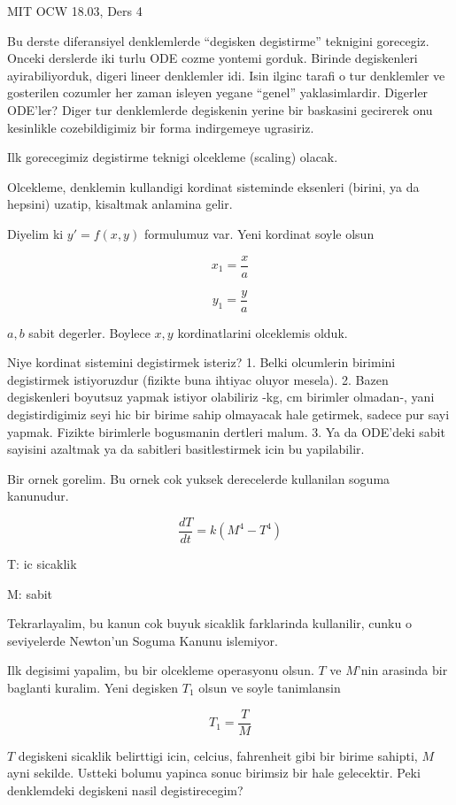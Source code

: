 \documentclass[12pt,fleqn]{article}
\begin{document}
MIT OCW 18.03, Ders 4

Bu derste diferansiyel denklemlerde ``degisken degistirme'' teknigini
gorecegiz. Onceki derslerde iki turlu ODE cozme yontemi
gorduk. Birinde degiskenleri ayirabiliyorduk, digeri lineer denklemler
idi. Isin ilginc tarafi o tur denklemler ve gosterilen cozumler her
zaman isleyen yegane ``genel'' yaklasimlardir. Digerler ODE'ler? Diger
tur denklemlerde degiskenin yerine bir baskasini gecirerek onu
kesinlikle cozebildigimiz bir forma indirgemeye ugrasiriz.

Ilk gorecegimiz degistirme teknigi olcekleme (scaling) olacak. 

Olcekleme, denklemin kullandigi kordinat sisteminde eksenleri (birini,
ya da hepsini) uzatip, kisaltmak anlamina gelir.

Diyelim ki $y' = f(x,y)$ formulumuz var. Yeni kordinat soyle olsun

\[ x_1 = \frac{x}{a} \]

\[ y_1 = \frac{y}{a} \]

$a,b$ sabit degerler. Boylece $x,y$ kordinatlarini olceklemis olduk.

Niye kordinat sistemini degistirmek isteriz? 1. Belki olcumlerin
birimini degistirmek istiyoruzdur (fizikte buna ihtiyac oluyor
mesela). 2. Bazen degiskenleri boyutsuz yapmak istiyor olabiliriz -kg,
cm birimler olmadan-, yani degistirdigimiz seyi hic bir birime sahip
olmayacak hale getirmek, sadece pur sayi yapmak. Fizikte birimlerle
bogusmanin dertleri malum. 3. Ya da ODE'deki sabit sayisini azaltmak
ya da sabitleri basitlestirmek icin bu yapilabilir.

Bir ornek gorelim. Bu ornek cok yuksek derecelerde kullanilan
soguma kanunudur. 

\[ \frac{dT}{dt} = k(M^4 - T^4) \]

T: ic sicaklik

M: sabit

Tekrarlayalim, bu kanun cok buyuk sicaklik farklarinda kullanilir,
cunku o seviyelerde Newton'un Soguma Kanunu islemiyor. 

Ilk degisimi yapalim, bu bir olcekleme operasyonu olsun. $T$ ve
$M$'nin arasinda bir baglanti kuralim. Yeni degisken $T_1$ olsun ve
soyle tanimlansin

\[ T_1 = \frac{T}{M} \]

$T$ degiskeni sicaklik belirttigi icin, celcius, fahrenheit gibi bir
birime sahipti, $M$ ayni sekilde. Ustteki bolumu yapinca sonuc
birimsiz bir hale gelecektir. Peki denklemdeki degiskeni nasil
degistirecegim? 
\end{document}
